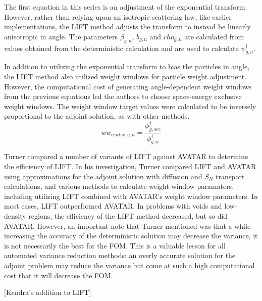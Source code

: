 The first equation in this series is an adjustment of the exponential transform. However, rather than relying upon an isotropic scattering law, like earlier implementations, the LIFT method adjusts the transform to instead be linearly anisotropic in angle. The parameters $\beta_{g,n}$, $b_{g,n}$ and $rho_{g,n}$ are calculated from values obtained from the deterministic calculation and are used to calculate $\psi^{\dagger}_{g,n}$. 

In addition to utilizing the exponential transform to bias the particles in angle, the LIFT method also utilized weight windows for particle weight adjustment. However, the computational cost of generating angle-dependent weight windows from the previous equations led the authors to choose space-energy exclusive weight windows. The weight window target values were calculated to be inversely proportional to the adjoint solution, as with other methods.
\begin{equation}
ww_{center,g,n} = \frac{\phi^{\dagger}_{g,src}}{\phi^{\dagger}_{g,n}}
\end{equation}

Turner compared a number of variants of LIFT \cite{turner_automatic_1997-1} against AVATAR to determine the efficiency of LIFT. In his investigation, Turner compared LIFT and AVATAR using approximations for the adjoint solution with diffusion and $S_N$ transport calculations, and various methods to calculate weight window paramaters, including utilizing LIFT combined with AVATAR's weight window parameters. In most cases, LIFT outperformed AVATAR. In problems with voids and low-density regions, the efficiency of the LIFT method decreased, but so did AVATAR. However, an important note that Turner mentioned was that a while increasing the accuracy of the deterministic solution may decrease the variance, it is not necessarily the best for the FOM. This is a valuable lesson for all automated variance reduction methods: an overly accurate solution for the adjoint problem may reduce the variance but come at such a high computational cost that it will decrease the FOM.

[Kendra's addition to LIFT]


